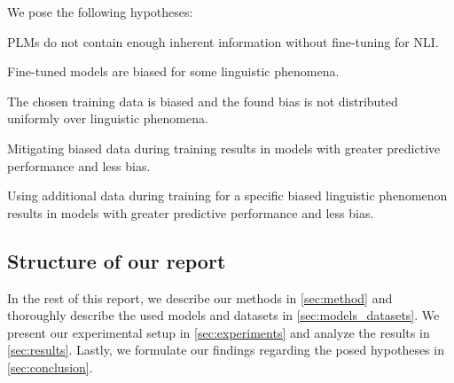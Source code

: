 \noindent
We pose the following hypotheses: \vspace*{-0.5em}
\begin{description}
  \setlength\itemsep{-0.3em}
  \item[H1] \acp{PLM} do not contain enough inherent information without fine-tuning for \ac{NLI}.
  \item[H2] Fine-tuned models are biased for some linguistic phenomena.
  \item[H3] The chosen training data is biased and the found bias is not distributed uniformly over linguistic phenomena.
  \item[H4] Mitigating biased data during training results in models with greater predictive performance and less bias.
  \item[H5] Using additional data during training for a specific biased linguistic phenomenon results in models with greater predictive performance and less bias.
\end{description}

\subsection{Structure of our report}
In the rest of this report, we describe our methods in \autoref{sec:method} and thoroughly describe the used models and datasets in \autoref{sec:models_datasets}. We present our experimental setup in \autoref{sec:experiments} and analyze the results in \autoref{sec:results}. Lastly, we formulate our findings regarding the posed hypotheses in \autoref{sec:conclusion}.